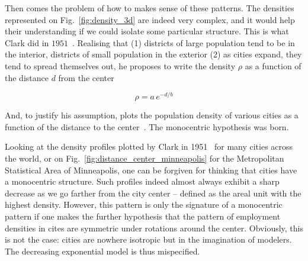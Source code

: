 Then comes the problem of how to makes sense of these patterns. The densities
represented on Fig.~\ref{fig:density_3d} are indeed very complex, and it would
help their understanding if we could isolate some particular structure.
This is what Clark did in $1951$~\cite{Clark:1951}. Realising that (1) districts of large
population tend to be in the interior, districts of small population in the
exterior (2) as cities expand, they tend to spread themselves out, he proposes
to write the density $\rho$ as a function of the distance $d$ from the center

\begin{equation}
    \rho = a\,e^{-d/b} 
\end{equation}

And, to justify his assumption, plots the population density of various cities as a function of
the distance to the center~\cite{Clark:1951}. The monocentric hypothesis was
born.

Looking at the density profiles plotted by Clark in 1951~\cite{Clark:1951} for
many cities across the world, or on Fig.~\ref{fig:distance_center_minneapolis}
for the Metropolitan Statistical Area of Minneapolis, one can be
forgiven for thinking that cities have a monocentric structure. Such profiles
indeed almost always exhibit a sharp decrease as we go farther from the city
center -- defined as the areal unit with the highest density. However, this
pattern is only the signature of a monocentric pattern if one makes the further
hypothesis that the pattern of employment densities in cites are symmetric
under rotations around the center. Obviously, this is not the case: cities are
nowhere isotropic but in the imagination of modelers. The decreasing exponential
model is thus mispecified.


